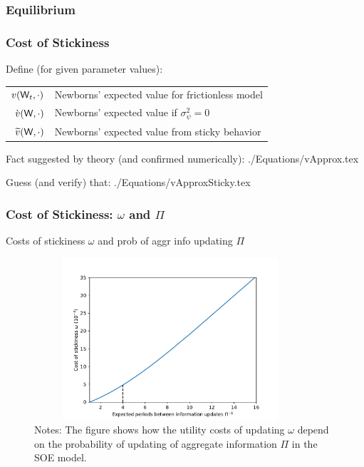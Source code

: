 \documentclass{beamer}\usepackage{dcolumn}
\providecommand{\perc}[1]{\widetilde{#1}}
\providecommand{\econtexRoot}{.}
\providecommand{\eq}{\econtexRoot/Equations}
\begin{document}
\begin{frame}
\frametitle{Equilibrium}

\footnotesize


\end{frame}


\begin{frame}
\frametitle{Cost of Stickiness}
Define (for given parameter values):
\begin{center}
\begin{tabular}{rl}
${v}(\mathsf{W}_t,\cdot)$ & Newborns' expected value for frictionless model
\\ $\grave{v}(\mathsf{W},\cdot)$ & Newborns' expected value if $\sigma^{2}_{\psi}=0$
\\ $\perc{v}(\Wage,\cdot)$ & Newborns' expected value from sticky behavior
\end{tabular}
\end{center}

Fact suggested by theory (and confirmed numerically):
 \eq/vApprox.tex

Guess (and verify) that:
 \eq/vApproxSticky.tex


\end{frame}


\begin{frame}
\frametitle{Cost of Stickiness: $\omega$ and $\Pi$}

Costs of stickiness $\omega$ and prob of aggr info updating $\Pi$

\begin{figure}
\label{costOfStickiness}
\includegraphics[width=0.9\textwidth, height=6cm]{../Figures/uCostvsPiInv.pdf}\\
\tiny Notes: The figure shows how the utility costs of updating $\omega$ depend on the probability of updating of aggregate information $\Pi$ in the SOE model.
\end{figure}

\end{frame}
\end{document}
